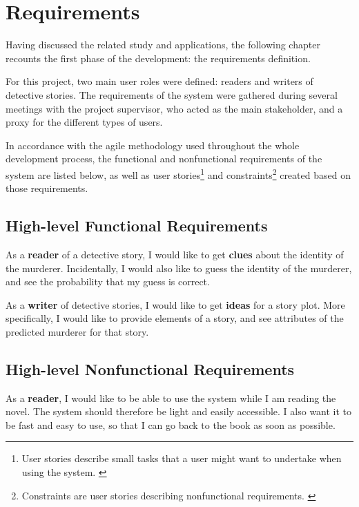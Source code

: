\documentclass{mproj}
\begin{document}
\chapter{Requirements}

Having discussed the related study and applications, the following chapter recounts the first phase of the development: the requirements definition. \par

For this project, two main user roles were defined: readers and writers of detective stories. The requirements of the system were gathered during several meetings with the project supervisor, who acted as the main stakeholder, and a proxy for the different types of users. \par 

In accordance with the agile methodology used throughout the whole development process, the functional and nonfunctional requirements of the system are listed below, as well as user stories\footnote{User stories describe small tasks that a user might want to undertake when using the system. \cite[Chapter~1]{userstoriesbook}} and constraints\footnote{Constraints are user stories describing nonfunctional requirements. \cite{userstoriesbook}} created based on those requirements. 


\section{High-level Functional Requirements}
	
As a \textbf{reader} of a detective story, I would like to get \textbf{clues} about the identity of the murderer. Incidentally, I would also like to guess the identity of the murderer, and see the probability that my guess is correct. \par

As a \textbf{writer} of detective stories, I would like to get \textbf{ideas} for a story plot. More specifically, I would like to provide elements of a story, and see attributes of the predicted murderer for that story.\par

\section{High-level Nonfunctional Requirements}
	
As a \textbf{reader}, I would like to be able to use the system while I am reading the novel. The system should therefore be light and easily accessible. I also want it to be fast and easy to use, so that I can go back to the book as soon as possible. 
\end{document}
